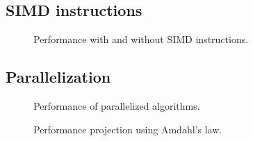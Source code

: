 
\subsection{SIMD instructions}

\begin{figure}[h!]
  \centering
  \label{fig:simd}
  \caption{Performance with and without SIMD instructions.}
\end{figure}

\subsection{Parallelization}

\begin{figure}[h!]
  \centering
  \label{fig:parallel_performance}
  \caption{Performance of parallelized algorithms.}
\end{figure}

\begin{figure}[h!]
  \centering
  \label{fig:amdahl}
  \caption{Performance projection using Amdahl's law.}
\end{figure}